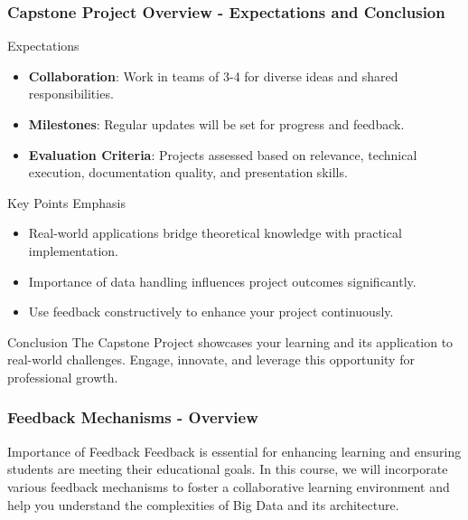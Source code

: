 \documentclass[aspectratio=169]{beamer}
\begin{document}
\begin{frame}[fragile]
    \frametitle{Capstone Project Overview - Expectations and Conclusion}
    \begin{block}{Expectations}
        \begin{itemize}
            \item \textbf{Collaboration}: Work in teams of 3-4 for diverse ideas and shared responsibilities.
            \item \textbf{Milestones}: Regular updates will be set for progress and feedback.
            \item \textbf{Evaluation Criteria}: Projects assessed based on relevance, technical execution, documentation quality, and presentation skills.
        \end{itemize}
    \end{block}
    
    \begin{block}{Key Points Emphasis}
        \begin{itemize}
            \item Real-world applications bridge theoretical knowledge with practical implementation.
            \item Importance of data handling influences project outcomes significantly.
            \item Use feedback constructively to enhance your project continuously.
        \end{itemize}
    \end{block}

    \begin{block}{Conclusion}
        The Capstone Project showcases your learning and its application to real-world challenges. 
        Engage, innovate, and leverage this opportunity for professional growth.
    \end{block}
\end{frame}

\begin{frame}[fragile]
    \frametitle{Feedback Mechanisms - Overview}
    \begin{block}{Importance of Feedback}
        Feedback is essential for enhancing learning and ensuring students are meeting their educational goals. 
        In this course, we will incorporate various feedback mechanisms to foster a collaborative learning environment and help you understand the complexities of Big Data and its architecture.
    \end{block}
\end{frame}
\end{document}
